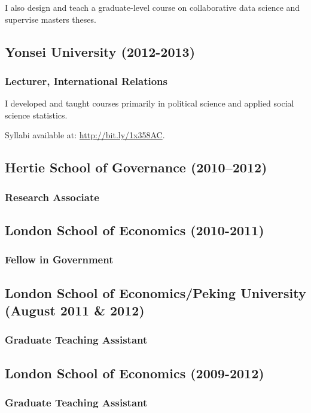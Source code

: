 \documentclass[a4paper]{article}
\begin{document}
\noindent I also design and teach a graduate-level course on collaborative data science and supervise masters theses.

\subsection*{Yonsei University (2012-2013)}
{\subsubsection*{Lecturer, International Relations}

I developed and taught courses primarily in political science and applied social science statistics.
\vspace{0.25cm}

\noindent Syllabi available at: \url{http://bit.ly/1x358AC}.

\subsection*{Hertie School of Governance (2010--2012)}
\subsubsection*{Research Associate}

\subsection*{London School of Economics (2010-2011)}
\subsubsection*{Fellow in Government}

\subsection*{London School of Economics/Peking University (August 2011 \& 2012)}
\subsubsection*{Graduate Teaching Assistant}

\subsection*{London School of Economics (2009-2012)}
\subsubsection*{Graduate Teaching Assistant}

}
\end{document}
